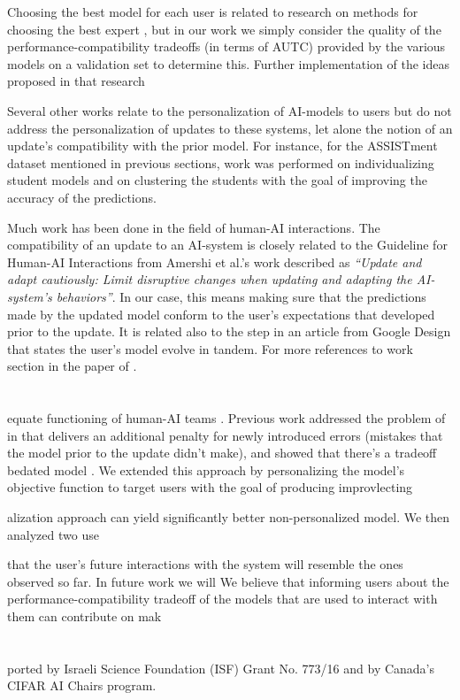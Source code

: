 \documentclass[letterpaper]{article} %
\theoremstyle{definition}
\begin{document}
Choosing the best model for each user is related to research on methods for choosing the best expert \cite{herbster1998tracking}, but in our work we simply consider the quality of the performance-compatibility tradeoffs (in terms of AUTC) provided by the various models on a validation set to determine this.
Further implementation of the ideas proposed in that research 

Several other works relate to the personalization of AI-models to users but do not address the personalization of updates to these systems, let alone the notion of an update's compatibility with the prior model. For instance, for the ASSISTment dataset mentioned in previous sections, work was performed on individualizing student models  \cite{wang2012student,pardos2010modeling} and on clustering the students \cite{trivedi2011clustering,trivedi2010spectral} with the goal of improving the accuracy of the predictions.

Much work has been done in the field of human-AI interactions. The compatibility of an update to an AI-system is closely related to the  Guideline for Human-AI Interactions from Amershi et al.'s work \cite{amershiuidelines} described as \emph{``Update and adapt cautiously: Limit disruptive changes when updating and adapting the
AI-system’s behaviors''}. In our case, this means making sure that the predictions made by the updated model conform to the user's expectations that developed prior to the update. It is related also to the  step in an article from Google Design \cite{lovejoy2017} that states the  user's model evolve in tandem. For more references to   work section in the paper of \citet{bansal2019updates}.
%
\section{}
%
 equate functioning of human-AI teams \cite{bansalyond, bansal2019updates}. Previous work addressed the problem of in that delivers an additional penalty for newly introduced errors (mistakes that the model prior to the update didn’t make), and showed that there's a tradeoff bedated model \cite{bansal2019updates}. We extended this approach by personalizing the model's objective function to target users with the goal of producing improvlecting 

alization approach can yield significantly better  non-personalized model.
We then analyzed two use  

 that the user's future interactions with the system will resemble the ones observed so far.
In future work we will     We believe that informing users  about the   performance-compatibility tradeoff  of the models that are used to interact with them can  contribute on mak 



\section{}
 ported by Israeli Science Foundation (ISF) Grant No. 773/16 and by Canada's CIFAR AI Chairs program.


\clearpage

\end{document}
